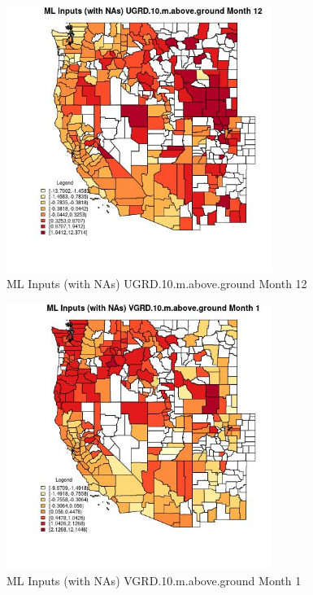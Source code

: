 \begin{figure} 
\centering  
\includegraphics[width=0.77\textwidth]{Code_Outputs/Report_ML_input_PM25_Step4_part_f_de_duplicated_aveswNAs_CountyUGRD10mabovegroundmedianMonth12.jpg} 
\caption{\label{fig:Report_ML_input_PM25_Step4_part_f_de_duplicated_aveswNAsCountyUGRD10mabovegroundmedianMonth12}ML Inputs (with NAs) UGRD.10.m.above.ground Month 12} 
\end{figure} 
 

\clearpage 

\begin{figure} 
\centering  
\includegraphics[width=0.77\textwidth]{Code_Outputs/Report_ML_input_PM25_Step4_part_f_de_duplicated_aveswNAs_CountyVGRD10mabovegroundmedianMonth1.jpg} 
\caption{\label{fig:Report_ML_input_PM25_Step4_part_f_de_duplicated_aveswNAsCountyVGRD10mabovegroundmedianMonth1}ML Inputs (with NAs) VGRD.10.m.above.ground Month 1} 
\end{figure} 
 

